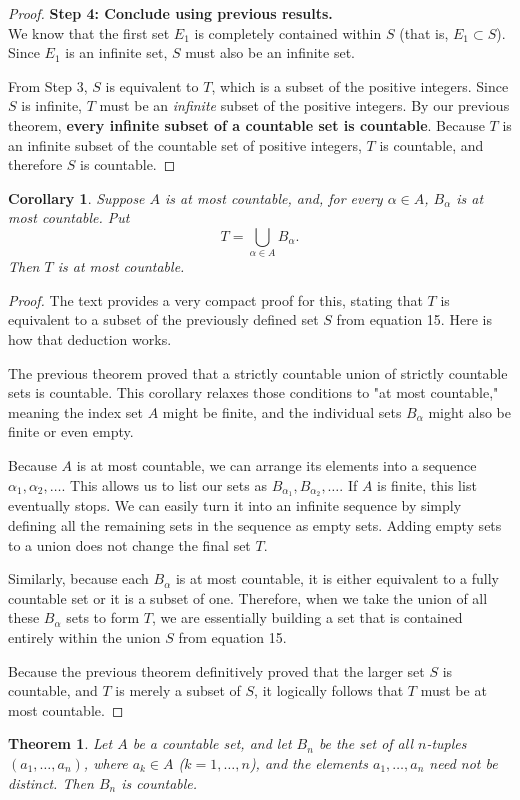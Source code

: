 \documentclass{article}
\theoremstyle{mythm}
\newtheorem{theorem}{Theorem}[section]
\newtheorem{corollary}{Corollary}[theorem]
\begin{document}
\begin{proof}
\textbf{Step 4: Conclude using previous results.} \\
We know that the first set $E_1$ is completely contained within $S$ (that is, $E_1 \subset S$). Since $E_1$ is an infinite set, $S$ must also be an infinite set. 

From Step 3, $S$ is equivalent to $T$, which is a subset of the positive integers. Since $S$ is infinite, $T$ must be an \textit{infinite} subset of the positive integers. By our previous theorem, \textbf{every infinite subset of a countable set is countable}. Because $T$ is an infinite subset of the countable set of positive integers, $T$ is countable, and therefore $S$ is countable.
\end{proof}
\begin{corollary}
Suppose $A$ is at most countable, and, for every $\alpha \in A$, $B_\alpha$ is at most countable. Put
\[ T = \bigcup_{\alpha \in A} B_\alpha. \]
Then $T$ is at most countable.
\end{corollary}

\begin{proof}
The text provides a very compact proof for this, stating that $T$ is equivalent to a subset of the previously defined set $S$ from equation 15. Here is how that deduction works.

The previous theorem proved that a strictly countable union of strictly countable sets is countable. This corollary relaxes those conditions to "at most countable," meaning the index set $A$ might be finite, and the individual sets $B_\alpha$ might also be finite or even empty. 

Because $A$ is at most countable, we can arrange its elements into a sequence $\alpha_1, \alpha_2, \dots$. This allows us to list our sets as $B_{\alpha_1}, B_{\alpha_2}, \dots$. If $A$ is finite, this list eventually stops. We can easily turn it into an infinite sequence by simply defining all the remaining sets in the sequence as empty sets. Adding empty sets to a union does not change the final set $T$.

Similarly, because each $B_\alpha$ is at most countable, it is either equivalent to a fully countable set or it is a subset of one. Therefore, when we take the union of all these $B_\alpha$ sets to form $T$, we are essentially building a set that is contained entirely within the union $S$ from equation 15. 

Because the previous theorem definitively proved that the larger set $S$ is countable, and $T$ is merely a subset of $S$, it logically follows that $T$ must be at most countable.
\end{proof}
\begin{theorem}
Let $A$ be a countable set, and let $B_n$ be the set of all $n$-tuples $(a_1, \dots, a_n)$, where $a_k \in A$ ($k = 1, \dots, n$), and the elements $a_1, \dots, a_n$ need not be distinct. Then $B_n$ is countable.
\end{theorem}
\end{document}
